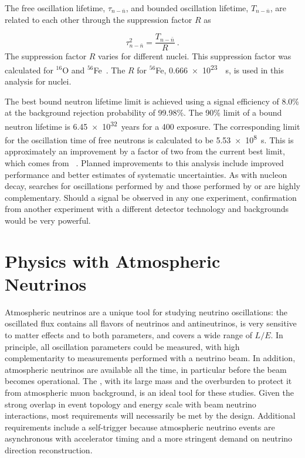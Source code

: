 The free \nnbar oscillation lifetime, $\tau_{n-\bar{n}}$, and bounded \nnbar oscillation lifetime, $T_{n-\bar{n}}$, are related to each other through the suppression factor $R$ as

\begin{equation}
    \tau^{2}_{n-\bar{n}} = \frac{T_{n-\bar{n}}}{R} ~.
    \label{eq:tau}
\end{equation}
The suppression factor $R$ varies for different nuclei. This suppression factor was calculated for $^{16}$O and $^{56}$Fe~\cite{Friedman:2008es}. The $R$ for $^{56}$Fe, \SI{0.666e23}{\per\s}, is used in this analysis for  nuclei.

The best bound neutron lifetime limit is achieved using a signal efficiency of \num{8.0}\% at the background rejection probability of \num{99.98}\%. The \num{90}\%  limit of a bound neutron lifetime is \SI{6.45e32}{years} for a \SI{400}{\ktyr} exposure. The corresponding limit for the oscillation time of free neutrons is calculated to be \SI{5.53e8}{\s}. This is approximately an improvement by a factor of two from the current best limit, which comes from \superk~\cite{Abe:2011ky}.  Planned improvements to this analysis include improved  performance and better estimates of systematic uncertainties.  As with nucleon decay, searches for \nnbar oscillations performed by  and those performed by \superk or \hyperk are highly complementary.  Should a signal be observed in any one experiment, confirmation from another experiment with a different detector technology and backgrounds would be very powerful. 

\section{Physics with Atmospheric Neutrinos}
\label{sec:nonaccel-atm}

Atmospheric neutrinos are a unique tool for studying neutrino oscillations: the oscillated flux contains all flavors of neutrinos and antineutrinos, is very sensitive to matter effects and to both \dm{} parameters, and covers a wide range of $L/E$. In principle, all oscillation parameters could be measured, with high
complementarity to measurements performed with a neutrino beam. In addition, atmospheric neutrinos are available all the time, in particular before the beam becomes operational. The  , with its large mass and the overburden to protect it from atmospheric muon background, is an ideal tool for these studies.  Given the strong overlap in event topology and energy scale with beam neutrino interactions, most requirements will necessarily be met by the  design. Additional requirements include a self-trigger because atmospheric neutrino events are asynchronous with accelerator timing and a more stringent demand on neutrino direction reconstruction.

